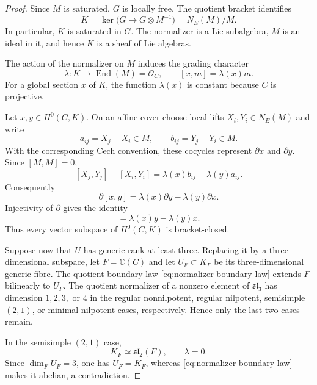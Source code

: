 \documentclass[11pt]{article}
\theoremstyle{definition}
\newcommand{\Ocal}{\mathcal O}
\newcommand{\End}{\operatorname{End}}
\begin{document}
\begin{proof}
Since $M$ is saturated, $G$ is locally free.  The quotient bracket identifies
\[
 K=\ker\bigl(G\longrightarrow G\otimes M^{-1}\bigr)
   =N_E(M)/M.
\]
In particular, $K$ is saturated in $G$.  The normalizer is a Lie
subalgebra, $M$ is an ideal in it, and hence $K$ is a sheaf of Lie algebras.

The action of the normalizer on $M$ induces the grading character
\[
 \lambda:K\longrightarrow\End(M)=\Ocal_C,
 \qquad [x,m]=\lambda(x)m.
\]
For a global section $x$ of $K$, the function $\lambda(x)$ is constant
because $C$ is projective.

Let $x,y\in H^0(C,K)$.  On an affine cover choose local lifts
$X_i,Y_i\in N_E(M)$ and write
\[
 a_{ij}=X_j-X_i\in M,\qquad b_{ij}=Y_j-Y_i\in M.
\]
With the corresponding Cech convention, these cocycles represent
$\partial x$ and $\partial y$.  Since $[M,M]=0$,
\[
 [X_j,Y_j]-[X_i,Y_i]
 =\lambda(x)b_{ij}-\lambda(y)a_{ij}.
\]
Consequently
\[
 \partial[x,y]
 =\lambda(x)\partial y-\lambda(y)\partial x.
\]
Injectivity of $\partial$ gives the identity
\begin{equation}
 [x,y]=\lambda(x)y-\lambda(y)x.
 \label{eq:normalizer-boundary-law}
\end{equation}
Thus every vector subspace of $H^0(C,K)$ is bracket-closed.

Suppose now that $U$ has generic rank at least three.  Replacing it by a
three-dimensional subspace, let $F=\mathbb C(C)$ and let
$U_F\subset K_F$ be its three-dimensional generic fibre.  The quotient
boundary law \eqref{eq:normalizer-boundary-law} extends $F$-bilinearly to
$U_F$.  The quotient
normalizer of a nonzero element of $\mathfrak{sl}_3$ has dimension
$1,2,3,$ or $4$ in the regular nonnilpotent, regular nilpotent,
semisimple $(2,1)$, or minimal-nilpotent cases, respectively.  Hence only
the last two cases remain.

In the semisimple $(2,1)$ case,
\[
 K_F\simeq\mathfrak{sl}_2(F),\qquad \lambda=0.
\]
Since $\dim_F U_F=3$, one has $U_F=K_F$, whereas
\eqref{eq:normalizer-boundary-law} makes it abelian, a contradiction.


\end{proof}
\end{document}
